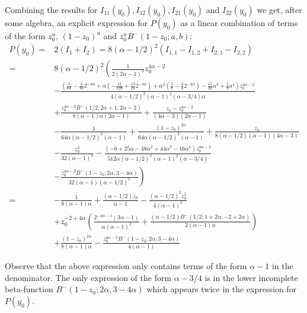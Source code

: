 Combining the results for $I_{11}(y_0), I_{12}(y_0), I_{21}(y_0)$ and $I_{22}(y_0)$ we get, after some algebra, an explicit expression 
for $P(y_0)$ as a linear combination of terms of the form $z_0^u$, $(1-z_0)^u$ and $z_0^u B^-(1-z_0;a,b)$: 
\begin{align*}
P(y_0)=& 2(I_1+I_2) = 8(\alpha- 1/2)^2(I_{1,1}-I_{1,2}+I_{2,1}-I_{2,2}) \\
=&8(\alpha-1/2)^2 \left(\frac{1}{2(2\alpha-1)^2 }z_0^{4\alpha -2} \right. \\ 
&\left.-\frac{\left(\frac{3}{64}- \frac{3}{16} 2^{-4\alpha}+ 
   \alpha (-\frac{41}{128} + \frac{13}{16}  2^{-4\alpha})  + 
   \alpha^2 (\frac{5}{8} - \frac{3}{4} 2^{-4\alpha}) - \frac{15}{32}\alpha^3 +\frac{1}{8} a^4   \right) z_0^{4 \alpha-2} }{4(\alpha-1/2)^2 (\alpha-1)^2 (\alpha-3/4) \alpha} \right. \\ 
&\left.+\frac{z_0^{4\alpha-2}B^-(1/2; 2\alpha+1, 2\alpha-2) }{8 (\alpha-1) \alpha (2\alpha-1)} +\frac{z_0 - z_0^{4\alpha -2}}{(4\alpha-3)(2\alpha-1)} \right.\\
&\left.-\frac{1}{64\alpha(\alpha-1/2)^2(\alpha-1)} +\frac{(1 - z_0)^{2\alpha}}{64\alpha(\alpha-1/2)^2 (\alpha-1)} +\frac{z_0}{8(\alpha-1/2)(\alpha-1)(4\alpha-3)} \right.\\
   &\left. - \frac{z_0^2}{32(\alpha-1)^2}
   - \frac{(-6 + 25\alpha - 48\alpha^2 + 44\alpha^3 -16\alpha^4) z_0^{4\alpha-2}}{512\alpha(\alpha-1/2)^2(\alpha-1)^2(\alpha-3/4)} \right. \\
   & \left. - \frac{z_0^{4\alpha-2}B^-(1 - z_0; 2\alpha, 3 - 4\alpha)}{32(\alpha-1)(\alpha-1/2)^2} \right) \\
=&-\frac{1}{8 (\alpha - 1) \alpha} + \frac{(\alpha - 1/2) z_0}{\alpha - 1} - \frac{(\alpha - 1/2)^2 z_0^2}{
	4 (\alpha - 1)^2} \\
&+ 
z_0^{-2 + 4 \alpha} \left(\frac{2^{-4 \alpha-1} (3 \alpha - 1)}{\alpha (\alpha - 1)^2} + \frac{(\alpha - 
	1/2 ) B^-(1/2; 1 + 2 \alpha, 
	-2 + 2 \alpha)}{2(\alpha - 1) \alpha} \right) \\
&+ \frac{(1 - 
	z_0)^{2 \alpha}}{8 (\alpha - 1) \alpha} - \frac{  
	z_0^{4 \alpha - 2} B^-(1 - z_0; 2 \alpha, 3 - 4 \alpha)}{4 (\alpha - 1)}
\end{align*}

Observe that the above expression only contains terms of the form $\alpha - 1$ in the denominator. 
The only expression of the form $\alpha - 3/4$ is in the lower incomplete beta-function $B^-(1 - z_0; 2 \alpha, 3 - 4 \alpha)$ which 
appears twice in the expression for $P(y_0)$. 


